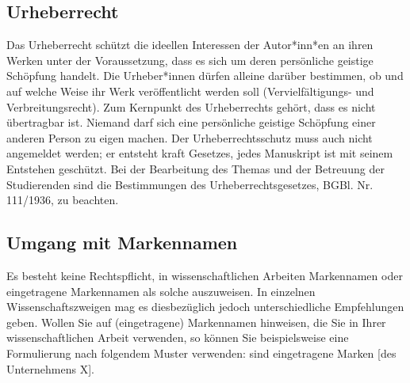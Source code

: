 \subsection{Urheberrecht}
Das Urheberrecht schützt die ideellen Interessen der Autor*inn*en an ihren Werken unter der Voraussetzung, dass es sich um deren persönliche geistige Schöpfung handelt. Die Urheber*innen dürfen alleine darüber bestimmen, ob und auf welche Weise ihr Werk veröffentlicht werden soll (Vervielfältigungs- und Verbreitungsrecht).
\vspace{3mm}\newline
Zum Kernpunkt des Urheberrechts gehört, dass es nicht übertragbar ist. Niemand darf sich eine persönliche geistige Schöpfung einer anderen Person zu eigen machen. Der Urheberrechtsschutz muss auch nicht angemeldet werden; er entsteht kraft Gesetzes, \dah jedes Manuskript ist mit seinem Entstehen geschützt.
\vspace{3mm}\newline
Bei der Bearbeitung des Themas und der Betreuung der Studierenden sind die Bestimmungen des Urheberrechtsgesetzes, BGBl. Nr. 111/1936, zu beachten.

\subsection{Umgang mit Markennamen}
Es besteht keine Rechtspflicht, in wissenschaftlichen Arbeiten Markennamen oder eingetragene Markennamen als solche auszuweisen. In einzelnen Wissenschaftszweigen mag es diesbezüglich jedoch unterschiedliche Empfehlungen geben. Wollen Sie auf (eingetragene) Markennamen hinweisen, die Sie in Ihrer wissenschaftlichen Arbeit verwenden, so können Sie beispielsweise eine Formulierung nach folgendem Muster verwenden:
\vspace{3mm} sind eingetragene Marken [des Unternehmens X].